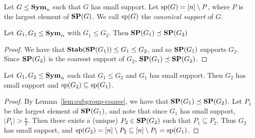 \documentclass[../paper.tex]{subfiles}
\begin{document}
\begin{definition}
  Let $G \leq \text{\textbf{Sym}}_n$ such that $G$ has small support. Let $\text{sp}(G) = [n]
  \setminus P$, where $P$ is the largest element of $\text{\textbf{SP}}(G)$. We call
  $\text{sp}(G)$ the \emph{canonical support} of $G$.
\end{definition}


\begin{lem}\label{lem:subgroup-coarse}
Let $G_1, G_2 \leq \text{\textbf{Sym}}_n$ with $G_1 \leq G_2$.  Then $\text{\textbf{SP}}(G_1)
  \preceq \text{\textbf{SP}}(G_2)$
\end{lem}
\begin{proof}
  We have that $\text{\textbf{Stab}}(\text{\textbf{SP}}(G_1)) \leq G_1 \leq G_2$, and so $\text{\textbf{SP}}(G_1)$
  supports $G_2$. Since $\text{\textbf{SP}}(G_2)$ is the coarsest support of $G_2$, $\text{\textbf{SP}}(G_1)
  \preceq \text{\textbf{SP}}(G_2)$.
\end{proof}

\begin{lem}
  Let $G_1, G_2 \leq \text{\textbf{Sym}}_n$ such that $G_1 \leq G_2$ and $G_1$ has small
  support. Then $G_2$ has small support and $\text{sp}(G_2) \subseteq \text{sp}(G_1)$.
  \label{lem:support-containment}
\end{lem}
\begin{proof}
  By Lemma~\ref{lem:subgroup-coarse}, we have that $\text{\textbf{SP}}(G_1)
  \preceq \text{\textbf{SP}}(G_2)$. Let $P_1$ be the largest element of $\text{\textbf{SP}}(G_1)$, and note
  that since $G_1$ has small support, $\vert P_1 \vert > \frac{n}{2}$. Then
  there exists a (unique) $P_2 \in \text{\textbf{SP}}(G_2)$ such that $P_1 \subseteq P_2$. Thus
  $G_2$ has small support, and $\text{sp}(G_2) = [n] \setminus P_2 \subseteq [n]
  \setminus P_1 = \text{sp}(G_1)$.
\end{proof}
\end{document}
